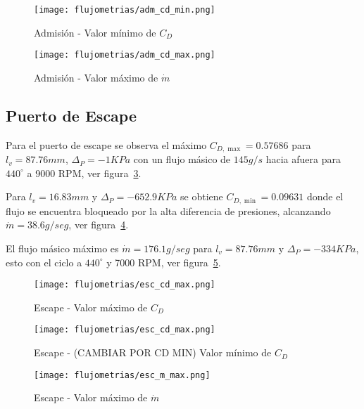 \begin{figure}[ht!]
    \centering
    \texttt{[image: flujometrias/adm\_cd\_min.png]}
    \caption{Admisión - Valor mínimo de $C_{D}$}\label{fig:adm_cd_min}
\end{figure}

\begin{figure}[ht!]
    \centering
    \texttt{[image: flujometrias/adm\_cd\_max.png]}
    \caption{Admisión - Valor máximo de $\dot{m}$}\label{fig:adm_m_max}
\end{figure}

\subsection{Puerto de Escape}

Para el puerto de escape se observa el máximo $C_{D,\max}=0.57686$ para
$l_{v}=87.76 mm$, $\Delta_{P}=-1 KPa$ con un flujo másico de $145 g/s$ hacia
afuera para $440^{\circ}$ a 9000 RPM, ver figura~\ref{fig:esc_cd_max}.


Para $l_{v}=16.83 mm$ y $\Delta_{P}=-652.9 KPa$ se obtiene $C_{D, \min}=0.09631$
donde el flujo se encuentra bloqueado por la alta diferencia de presiones,
alcanzando $\dot{m}=38.6 g/seg$, ver figura~\ref{fig:esc_cd_min}.


El flujo másico máximo es $\dot{m}=176.1 g/seg$ para $l_{v}=87.76 mm$ y
$\Delta_{P}=-334 KPa$, esto con el ciclo a $440^{\circ}$ y 7000 RPM,
ver figura~\ref{fig:esc_m_max}.

\begin{figure}[ht]
    \centering
    \texttt{[image: flujometrias/esc\_cd\_max.png]}
    \caption{Escape - Valor máximo de $C_{D}$}\label{fig:esc_cd_max}
\end{figure}

\begin{figure}[ht]
    \centering
    \texttt{[image: flujometrias/esc\_cd\_max.png]}
    \caption{Escape - (CAMBIAR POR CD MIN) Valor mínimo de $C_{D}$}\label{fig:esc_cd_min}
\end{figure}

\begin{figure}[ht]
    \centering
    \texttt{[image: flujometrias/esc\_m\_max.png]}
    \caption{Escape - Valor máximo de $\dot{m}$}\label{fig:esc_m_max}
\end{figure}





